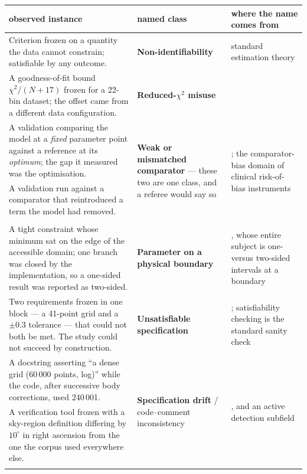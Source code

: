 \documentclass[11pt,a4paper]{article}
\begin{document}
\begin{table}[t]
\centering
\small
\begin{tabular}{p{4.9cm}p{3.6cm}p{5.9cm}}
\toprule
observed instance & named class & where the name comes from \\
\midrule
Criterion frozen on a quantity the data cannot constrain; satisfiable by any outcome. &
\textbf{Non-identifiability} & standard estimation theory \\
\addlinespace
A goodness-of-fit bound $\chi^2/(N+17)$ frozen for a 22-bin dataset; the offset came from a
different data configuration. &
\textbf{Reduced-$\chi^2$ misuse} & \citet{andrae2010} \\
\addlinespace
A validation comparing the model at a \emph{fixed} parameter point against a reference at its
\emph{optimum}; the gap it measured was the optimisation. &
\multirow{3}{3.4cm}{\textbf{Weak or mismatched comparator} --- these two are one class, and a
referee would say so} &
\multirow{3}{5.7cm}{\citet{dacrema2019}; the comparator-bias domain of clinical
risk-of-bias instruments} \\
A validation run against a comparator that reintroduced a term the model had removed. & & \\
 & & \\
\addlinespace
A tight constraint whose minimum sat on the edge of the accessible domain; one branch was
closed by the implementation, so a one-sided result was reported as two-sided. &
\textbf{Parameter on a physical boundary} & \citet{feldman1998}, whose entire subject is one-
versus two-sided intervals at a boundary \\
\addlinespace
Two requirements frozen in one block --- a 41-point grid and a $\pm0.3$ tolerance --- that
could not both be met. The study could not succeed by construction. &
\textbf{Unsatisfiable specification} & \citet{rozier2007}; satisfiability checking is the
standard sanity check \\
\addlinespace
A docstring asserting ``a dense grid (60\,000 points, log)'' while the code, after successive
body corrections, used 240\,001. &
\multirow{3}{3.4cm}{\textbf{Specification drift} / code--comment inconsistency} &
\multirow{3}{5.7cm}{\citet{panthaplackel2021}, and an active detection subfield} \\
A verification tool frozen with a sky-region definition differing by $10^\circ$ in right
ascension from the one the corpus used everywhere else. & & \\
 & & \\

\end{tabular}
\end{table}
\end{document}
